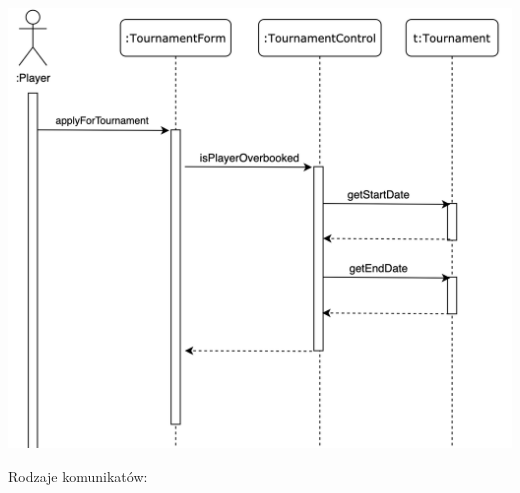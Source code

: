 \documentclass[12pt]{article}
\begin{document}
                \begin{center}
                    \includegraphics[scale=0.40]{ooad/sequence.png}
                \end{center}

                Rodzaje komunikatów:
\end{document}
